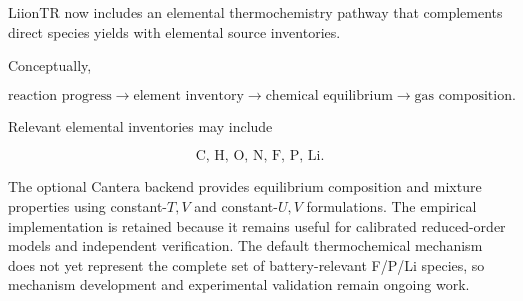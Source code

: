 LiionTR now includes an elemental thermochemistry pathway that complements
direct species yields with elemental source inventories.

Conceptually,

\begin{equation}
    \text{reaction progress}
    \longrightarrow
    \text{element inventory}
    \longrightarrow
    \text{chemical equilibrium}
    \longrightarrow
    \text{gas composition}.
\end{equation}

Relevant elemental inventories may include

\begin{equation}
    \mathrm{
        C,\,
        H,\,
        O,\,
        N,\,
        F,\,
        P,\,
        Li
    }.
\end{equation}

The optional Cantera backend provides equilibrium composition and mixture
properties using constant-\(T,V\) and constant-\(U,V\) formulations.
The empirical implementation is retained because it remains useful for
calibrated reduced-order models and independent verification. The default
thermochemical mechanism does not yet represent the complete set of
battery-relevant F/P/Li species, so mechanism development and experimental
validation remain ongoing work.
